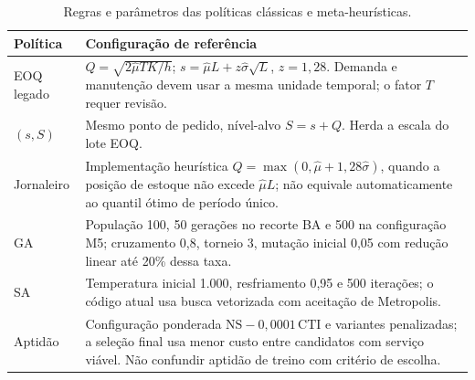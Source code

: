 \begin{table}[htbp]\centering\small
\caption{Regras e parâmetros das políticas clássicas e meta-heurísticas.}\label{tab:classic_meta_params}
\begin{tabular}{@{}p{3cm}p{11.4cm}@{}}\toprule
\textbf{Política} & \textbf{Configuração de referência}\\\midrule
EOQ legado & $Q=\sqrt{2\hat\mu T K/h}$; $s=\hat\mu L+z\hat\sigma\sqrt L$, $z=1{,}28$. Demanda e manutenção devem usar a mesma unidade temporal; o fator $T$ requer revisão.\\
$(s,S)$ & Mesmo ponto de pedido, nível-alvo $S=s+Q$. Herda a escala do lote EOQ.\\
Jornaleiro & Implementação heurística $Q=\max(0,\hat\mu+1{,}28\hat\sigma)$, quando a posição de estoque não excede $\hat\mu L$; não equivale automaticamente ao quantil ótimo de período único.\\
GA & População 100, 50 gerações no recorte BA e 500 na configuração M5; cruzamento 0,8, torneio 3, mutação inicial 0,05 com redução linear até 20\% dessa taxa.\\
SA & Temperatura inicial 1.000, resfriamento 0,95 e 500 iterações; o código atual usa busca vetorizada com aceitação de Metropolis.\\
Aptidão & Configuração ponderada $\mathrm{NS}-0{,}0001\,\mathrm{CTI}$ e variantes penalizadas; a seleção final usa menor custo entre candidatos com serviço viável. Não confundir aptidão de treino com critério de escolha.\\
\bottomrule\end{tabular}\end{table}

